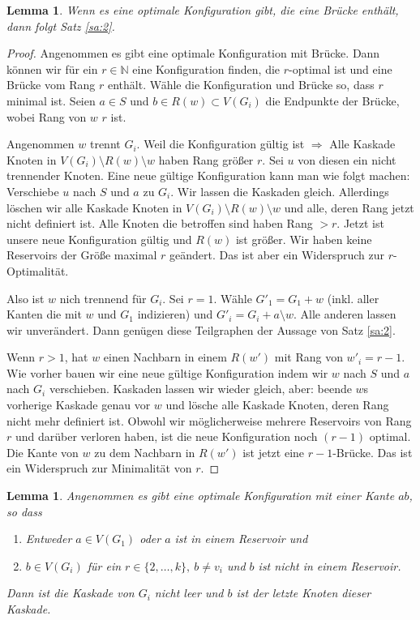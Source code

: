 \documentclass[12pt,a4paper]{scrartcl}
\numberwithin{equation}{section} %
\theoremstyle{definition}
\theoremstyle{plain}
\newtheorem{lem}[auf]{Lemma}
\newcommand{\nn}{\mathbb{N}}
\begin{document}
\begin{lem}
Wenn es eine optimale Konfiguration gibt, die eine Brücke enthält, dann folgt Satz \ref{sa:2}.
\label{lem:3}
\end{lem}
\begin{proof}
Angenommen es gibt eine optimale Konfiguration mit Brücke. Dann können wir für ein $r\in\nn$ eine Konfiguration finden, die $r$-optimal ist und eine Brücke vom Rang $r$ enthält. Wähle die Konfiguration und Brücke so, dass $r$ minimal ist. Seien $a\in S$ und $b\in R(w)\subset V(G_i)$ die Endpunkte der Brücke, wobei Rang von $w$ $r$ ist.\par
Angenommen $w$ trennt $G_i$. Weil die Konfiguration gültig ist $\Rightarrow$ Alle Kaskade Knoten in $V(G_i)\setminus R(w)\setminus w$ haben Rang größer $r$. Sei $u$ von diesen ein nicht trennender Knoten. Eine neue gültige Konfiguration kann man wie folgt machen: Verschiebe $u$ nach $S$ und $a$ zu $G_i$. Wir lassen die Kaskaden gleich. Allerdings löschen wir alle Kaskade Knoten in $V(G_i)\setminus R(w)\setminus w$  und alle, deren Rang jetzt nicht definiert ist. Alle Knoten die betroffen sind haben Rang $>r$. Jetzt ist unsere neue Konfiguration gültig und $R(w)$ ist größer. Wir haben keine Reservoirs der Größe maximal $r$ geändert. Das ist aber ein Widerspruch zur $r$-Optimalität.\par 
Also ist $w$ nich trennend für $G_i$. Sei $r=1$. Wähle $G'_1=G_1+w$ (inkl. aller Kanten die mit $w$ und $G_1$ indizieren) und $G'_i=G_i+a\setminus w$. Alle anderen lassen wir unverändert. Dann genügen diese Teilgraphen der Aussage von Satz \ref{sa:2}. \par 
Wenn $r>1$, hat $w$ einen Nachbarn in einem $R(w')$ mit Rang von $w'_i=r-1$. Wie vorher bauen wir eine neue gültige Konfiguration indem wir $w$ nach $S$ und $a$ nach $G_i$ verschieben. Kaskaden lassen wir wieder gleich, aber: beende $w$s vorherige Kaskade genau vor $w$ und lösche alle Kaskade Knoten, deren Rang nicht mehr definiert ist. Obwohl wir möglicherweise mehrere Reservoirs von Rang $r$ und darüber verloren haben, ist die neue Konfiguration noch $(r-1)$ optimal. Die Kante von $w$ zu dem Nachbarn in $R(w')$ ist jetzt eine $r-1$-Brücke. Das ist ein Widerspruch zur Minimalität von $r$.
\end{proof}
\begin{lem}
\label{lem:4}
Angenommen es gibt eine optimale Konfiguration mit einer Kante $ab$, so dass 
\begin{enumerate}
\item Entweder $a\in V(G_1)$ oder $a$ ist in einem Reservoir und
\item $b\in V(G_i)$ für ein $r\in\lbrace 2,\dotsc,k\rbrace,~b\neq v_i$ und $b$ ist nicht in einem Reservoir.
\end{enumerate}
Dann ist die Kaskade von $G_i$ nicht leer und $b$ ist der letzte Knoten dieser Kaskade.
\end{lem}
\end{document}
